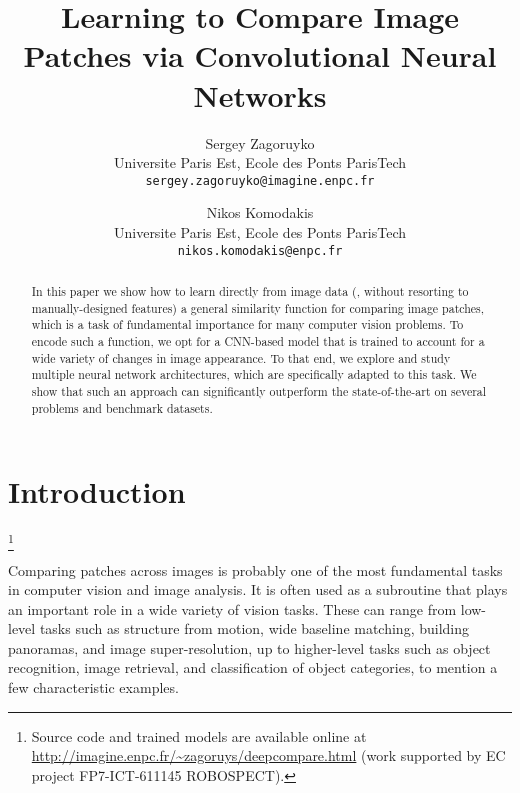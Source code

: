 \documentclass[10pt,twocolumn,letterpaper]{article}
\newcommand\blfootnote[1]{%
  \begingroup
  \renewcommand\thefootnote{}\footnote{#1}%
  \addtocounter{footnote}{-1}%
  \endgroup
}
\begin{document}
\title{Learning to Compare Image Patches via Convolutional Neural Networks}

\author{Sergey Zagoruyko\\
Universite Paris Est, Ecole des Ponts ParisTech\\
{\tt\small sergey.zagoruyko@imagine.enpc.fr}
\and
Nikos Komodakis\\
Universite Paris Est, Ecole des Ponts ParisTech\\
{\tt\small nikos.komodakis@enpc.fr}\\
}

\maketitle

\begin{abstract}
\vspace{-4pt}
In this paper we show how to learn %
directly from image data (\ie, without resorting to manually-designed features) a general similarity function for comparing image patches, which is a task of fundamental importance for many computer vision problems. To encode such a function, we  opt for  a CNN-based model that is trained to account for a wide variety of changes in image appearance. To that end, we explore and study multiple neural network architectures, which are specifically adapted to this task. We show that such an approach can significantly outperform the state-of-the-art  on several problems and benchmark datasets.
\end{abstract}

\vspace{-15pt}
\section{Introduction}
\blfootnote{Source code and trained models are available online at \url{http://imagine.enpc.fr/~zagoruys/deepcompare.html} (work  supported by  EC project FP7-ICT-611145 ROBOSPECT).}
Comparing patches across images is probably one of the most fundamental tasks in computer vision and image analysis. It is often used as a subroutine that plays an important role in a wide variety of vision tasks. These can range from low-level tasks such as  structure from motion, wide baseline matching, building panoramas, and image super-resolution, up to higher-level tasks such as object recognition, image retrieval, and classification of object categories, to mention a few characteristic examples. 
\end{document}
